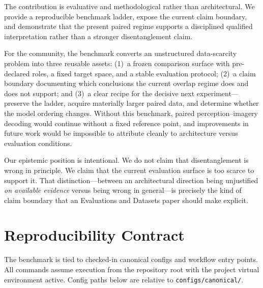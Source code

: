\documentclass{article}
\begin{document}
The contribution is evaluative and methodological rather than architectural.  We
provide a reproducible benchmark ladder, expose the current claim boundary, and
demonstrate that the present paired regime supports a disciplined qualified
interpretation rather than a stronger disentanglement claim.

For the community, the benchmark converts an unstructured data-scarcity problem
into three reusable assets:
(1)~a frozen comparison surface with pre-declared roles, a fixed target space,
and a stable evaluation protocol;
(2)~a claim boundary documenting which conclusions the current overlap regime
does and does not support; and
(3)~a clear recipe for the decisive next experiment---preserve the ladder,
acquire materially larger paired data, and determine whether the model ordering
changes.
Without this benchmark, paired perception--imagery decoding would continue
without a fixed reference point, and improvements in future work would be
impossible to attribute cleanly to architecture versus evaluation conditions.

Our epistemic position is intentional.  We do not claim that disentanglement is
wrong in principle.  We claim that the current evaluation surface is too scarce
to support it.  That distinction---between an architectural direction being
unjustified \emph{on available evidence} versus being wrong in general---is
precisely the kind of claim boundary that an Evaluations and Datasets paper
should make explicit.




\appendix

\section{Reproducibility Contract}
\label{app:repro}

The benchmark is tied to checked-in canonical configs and workflow entry points.
All commands assume execution from the repository root with the project virtual
environment active.  Config paths below are relative to
\texttt{configs/canonical/}.
\end{document}
